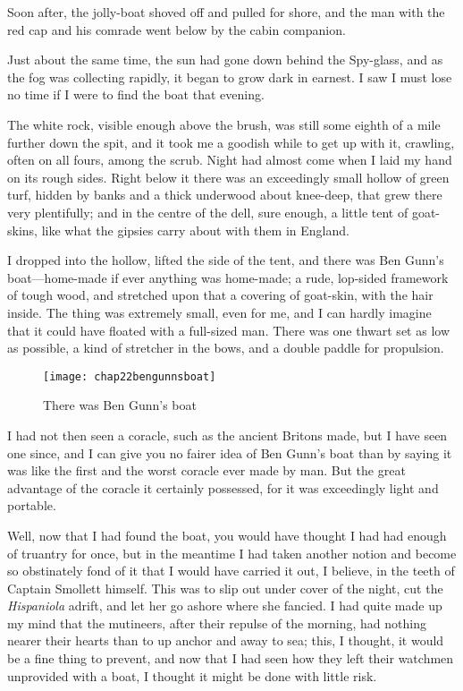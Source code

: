 Soon after, the jolly-boat shoved off and pulled for shore, and the man with the red cap and his comrade went below by the cabin companion.

Just about the same time, the sun had gone down behind the Spy-glass, and as the fog was collecting rapidly, it began to grow dark in earnest. I saw I must lose no time if I were to find the boat that evening.

The white rock, visible enough above the brush, was still some eighth of a mile further down the spit, and it took me a goodish while to get up with it, crawling, often on all fours, among the scrub. Night had almost come when I laid my hand on its rough sides. Right below it there was an exceedingly small hollow of green turf, hidden by banks and a thick underwood about knee-deep, that grew there very plentifully; and in the centre of the dell, sure enough, a little tent of goat-skins, like what the gipsies carry about with them in England.

I dropped into the hollow, lifted the side of the tent, and there was Ben Gunn's boat—home-made if ever anything was home-made; a rude, lop-sided framework of tough wood, and stretched upon that a covering of goat-skin, with the hair inside. The thing was extremely small, even for me, and I can hardly imagine that it could have floated with a full-sized man. There was one thwart set as low as possible, a kind of stretcher in the bows, and a double paddle for propulsion.

  \begin{sidewaysfigure}
\texttt{[image: chap22bengunnsboat]}%
\caption{There was Ben Gunn's boat}
\end{sidewaysfigure} 
 

I had not then seen a coracle, such as the ancient Britons made, but I have seen one since, and I can give you no fairer idea of Ben Gunn's boat than by saying it was like the first and the worst coracle ever made by man. But the great advantage of the coracle it certainly possessed, for it was exceedingly light and portable.

Well, now that I had found the boat, you would have thought I had had enough of truantry for once, but in the meantime I had taken another notion and become so obstinately fond of it that I would have carried it out, I believe, in the teeth of Captain Smollett himself. This was to slip out under cover of the night, cut the \textit{Hispaniola} adrift, and let her go ashore where she fancied. I had quite made up my mind that the mutineers, after their repulse of the morning, had nothing nearer their hearts than to up anchor and away to sea; this, I thought, it would be a fine thing to prevent, and now that I had seen how they left their watchmen unprovided with a boat, I thought it might be done with little risk.

